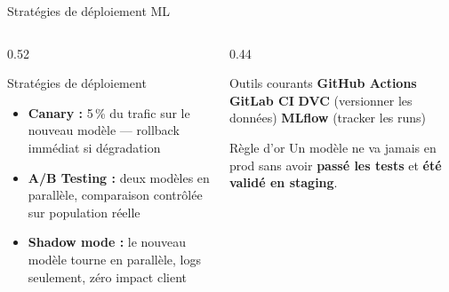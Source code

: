 \documentclass[aspectratio=169, 10pt]{beamer}
\begin{document}
\begin{frame}{Stratégies de déploiement ML}
  \begin{columns}[T]
    \begin{column}{0.52\textwidth}
      \begin{exampleblock}{Stratégies de déploiement}
        \begin{itemize}
          \item \textbf{Canary :} 5\,\% du trafic sur le nouveau modèle ---
                rollback immédiat si dégradation
          \item \textbf{A/B Testing :} deux modèles en parallèle,
                comparaison contrôlée sur population réelle
          \item \textbf{Shadow mode :} le nouveau modèle tourne en parallèle,
                logs seulement, zéro impact client
        \end{itemize}
      \end{exampleblock}
    \end{column}
    \begin{column}{0.44\textwidth}
      \begin{block}{Outils courants}
        \textbf{GitHub Actions} \textbullet{}
        \textbf{GitLab CI} \textbullet{}
        \textbf{DVC} (versionner les données) \textbullet{}
        \textbf{MLflow} (tracker les runs)
      \end{block}
      \smallskip
      \begin{alertblock}{Règle d'or}
        Un modèle ne va jamais en prod sans avoir
        \textbf{passé les tests} et \textbf{été validé en staging}.
      \end{alertblock}
    \end{column}
  \end{columns}
\end{frame}
\end{document}
